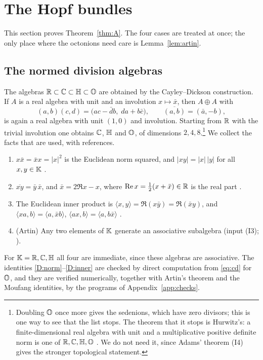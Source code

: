 \section{The Hopf bundles}\label{ch:hopf}

This section proves Theorem~\ref{thm:A}. The four cases are treated at once; the only place where the octonions need care is Lemma~\ref{lem:artin}.

\subsection{The normed division algebras}\label{sec:algebras}

The algebras $\mathbb{R}\subset\mathbb{C}\subset\mathbb{H}\subset\mathbb{O}$ are obtained by the Cayley--Dickson construction. If $A$ is a real algebra with unit and an involution $x\mapsto\bar x$, then $A\oplus A$ with
\begin{equation}\label{eq:cd}
(a,b)(c,d)=\bigl(ac-\bar d b,\;da+b\bar c\bigr),\qquad \overline{(a,b)}=(\bar a,-b),
\end{equation}
is again a real algebra with unit $(1,0)$ and involution. Starting from $\mathbb{R}$ with the trivial involution one obtains $\mathbb{C}$, $\mathbb{H}$ and $\mathbb{O}$, of dimensions $2,4,8$.\footnote{Doubling $\mathbb{O}$ once more gives the sedenions, which have zero divisors; this is one way to see that the list stops. The theorem that it stops is Hurwitz's: a finite-dimensional real algebra with unit and a multiplicative positive definite norm is one of $\mathbb{R},\mathbb{C},\mathbb{H},\mathbb{O}$ \cite[Section~2]{Bae02}. We do not need it, since Adams' theorem (I4) gives the stronger topological statement.} We collect the facts that are used, with references.

\begin{enumerate}[label=(D\arabic*)]
\item\label{D:norm} $x\bar x=\bar x x=|x|^2$ is the Euclidean norm squared, and $|xy|=|x|\,|y|$ for all $x,y\in\mathbb{K}$ \cite[Section~2.2]{Bae02}.
\item\label{D:conj} $\overline{xy}=\bar y\,\bar x$, and $\bar x=2\Re x-x$, where $\operatorname{Re} x=\tfrac12(x+\bar x)\in\mathbb{R}$ is the real part \cite[Section~2.2]{Bae02}.
\item\label{D:inner} The Euclidean inner product is $\langle x,y\rangle=\Re(x\bar y)=\Re(\bar x y)$, and $\langle xa,b\rangle=\langle a,\bar x b\rangle$, $\langle ax,b\rangle=\langle a,b\bar x\rangle$ \cite[Chapter~III]{Sch66}.
\item\label{D:artin} (Artin) Any two elements of $\mathbb{K}$ generate an associative subalgebra (input (I3); \cite[Theorem~3.1]{Sch66}).
\end{enumerate}
For $\mathbb{K}=\mathbb{R},\mathbb{C},\mathbb{H}$ all four are immediate, since these algebras are associative. The identities \ref{D:norm}--\ref{D:inner} are checked by direct computation from \eqref{eq:cd} for $\mathbb{O}$, and they are verified numerically, together with Artin's theorem and the Moufang identities, by the programs of Appendix~\ref{app:checks}.

